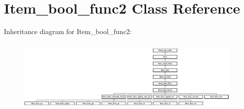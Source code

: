 \hypertarget{classItem__bool__func2}{}\section{Item\+\_\+bool\+\_\+func2 Class Reference}
\label{classItem__bool__func2}
Inheritance diagram for Item\+\_\+bool\+\_\+func2\+:\begin{figure}[H]
\begin{center}
\leavevmode
\includegraphics[height=3.641618cm]{classItem__bool__func2}
\end{center}
\end{figure}
